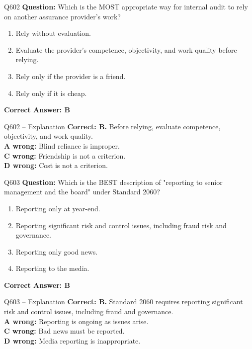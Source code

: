 \documentclass[aspectratio=169,10pt]{beamer}
\begin{document}
	\begin{frame}[t]{Q602}
		\small
		\textbf{Question:} Which is the MOST appropriate way for internal audit to rely on another assurance provider's work?
		\begin{enumerate}[label=\Alph*.,itemsep=1pt,topsep=2pt]
			\item Rely without evaluation.
			\item Evaluate the provider's competence, objectivity, and work quality before relying.
			\item Rely only if the provider is a friend.
			\item Rely only if it is cheap.
		\end{enumerate}
		\vspace{4pt}
		\textbf{Correct Answer: B}
	\end{frame}
	
	\begin{frame}[t]{Q602 -- Explanation}
		\small
		\textbf{Correct: B.} Before relying, evaluate competence, objectivity, and work quality. \\[4pt]
		\textbf{A wrong:} Blind reliance is improper. \\[2pt]
		\textbf{C wrong:} Friendship is not a criterion. \\[2pt]
		\textbf{D wrong:} Cost is not a criterion.
	\end{frame}
	
	\begin{frame}[t]{Q603}
		\small
		\textbf{Question:} Which is the BEST description of "reporting to senior management and the board" under Standard 2060?
		\begin{enumerate}[label=\Alph*.,itemsep=1pt,topsep=2pt]
			\item Reporting only at year-end.
			\item Reporting significant risk and control issues, including fraud risk and governance.
			\item Reporting only good news.
			\item Reporting to the media.
		\end{enumerate}
		\vspace{4pt}
		\textbf{Correct Answer: B}
	\end{frame}
	
	\begin{frame}[t]{Q603 -- Explanation}
		\small
		\textbf{Correct: B.} Standard 2060 requires reporting significant risk and control issues, including fraud and governance. \\[4pt]
		\textbf{A wrong:} Reporting is ongoing as issues arise. \\[2pt]
		\textbf{C wrong:} Bad news must be reported. \\[2pt]
		\textbf{D wrong:} Media reporting is inappropriate.
	\end{frame}
	
\end{document}
